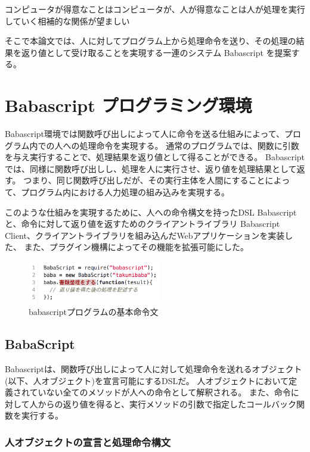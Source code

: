 コンピュータが得意なことはコンピュータが、人が得意なことは人が処理を実行していく相補的な関係が望ましい

そこで本論文では、人に対してプログラム上から処理命令を送り、その処理の結果を返り値として受け取ることを実現する一連のシステム
Babascript を提案する。

\section{Babascript
プログラミング環境}\label{babascript-ux30d7ux30edux30b0ux30e9ux30dfux30f3ux30b0ux74b0ux5883}

Babascript環境では関数呼び出しによって人に命令を送る仕組みによって、プログラム内での人への処理命令を実現する。
通常のプログラムでは、関数に引数を与え実行することで、処理結果を返り値として得ることができる。
Babascriptでは、同様に関数呼び出しし、処理を人に実行させ、返り値を処理結果として返す。
つまり、同じ関数呼び出しだが、その実行主体を人間にすることによって、プログラム内における人力処理の組み込みを実現する。

このような仕組みを実現するために、人への命令構文を持ったDSL Babascript
と、命令に対して返り値を返すためのクライアントライブラリ Babascript
Client、クライアントライブラリを組み込んだWebアプリケーションを実装した、
また、プラグイン機構によってその機能を拡張可能にした。

\begin{figure}[h]
  \centering
  \includegraphics[width=220px]{./images/script_01.png}
  \caption{babascriptプログラムの基本命令文}
  \label{script_01}
\end{figure}

\subsection{BabaScript}\label{babascript}

Babascriptは、関数呼び出しによって人に対して処理命令を送れるオブジェクト(以下、人オブジェクト)を宣言可能にするDSLだ。
人オブジェクトにおいて定義されていない全てのメソッドが人への命令として解釈される。
また、命令に対して人からの返り値を得ると、実行メソッドの引数で指定したコールバック関数を実行する。

\subsubsection{人オブジェクトの宣言と処理命令構文}\label{ux4ebaux30aaux30d6ux30b8ux30a7ux30afux30c8ux306eux5ba3ux8a00ux3068ux51e6ux7406ux547dux4ee4ux69cbux6587}

